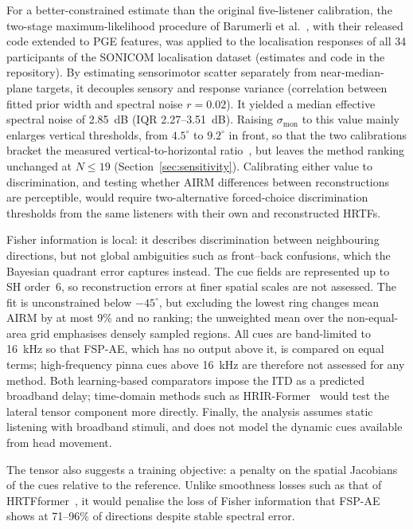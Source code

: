 \documentclass[journal]{IEEEtran}
\begin{document}
For a better-constrained estimate than the original five-listener calibration, the two-stage maximum-likelihood procedure of Barumerli et al.~\cite{Barumerli2026}, with their released code extended to PGE features, was applied to the localisation responses of all 34 participants of the SONICOM localisation dataset (estimates and code in the repository). By estimating sensorimotor scatter separately from near-median-plane targets, it decouples sensory and response variance (correlation between fitted prior width and spectral noise \(r=0.02\)). It yielded a median effective spectral noise of 2.85~dB (IQR 2.27--3.51~dB). Raising \(\sigma_{\mathrm{mon}}\) to this value mainly enlarges vertical thresholds, from \(4.5^\circ\) to \(9.2^\circ\) in front, so that the two calibrations bracket the measured vertical-to-horizontal ratio~\cite{Grantham2003}, but leaves the method ranking unchanged at \(N\le19\) (Section~\ref{sec:sensitivity}). Calibrating either value to discrimination, and testing whether AIRM differences between reconstructions are perceptible, would require two-alternative forced-choice discrimination thresholds from the same listeners with their own and reconstructed HRTFs.

Fisher information is local: it describes discrimination between neighbouring directions, but not global ambiguities such as front--back confusions, which the Bayesian quadrant error captures instead. The cue fields are represented up to SH order~6, so reconstruction errors at finer spatial scales are not assessed. The fit is unconstrained below \(-45^\circ\), but excluding the lowest ring changes mean AIRM by at most 9\% and no ranking; the unweighted mean over the non-equal-area grid emphasises densely sampled regions. All cues are band-limited to 16~kHz so that FSP-AE, which has no output above it, is compared on equal terms; high-frequency pinna cues above 16~kHz are therefore not assessed for any method. Both learning-based comparators impose the ITD as a predicted broadband delay; time-domain methods such as HRIR-Former~\cite{Xu2026HRIRFormer} would test the lateral tensor component more directly. Finally, the analysis assumes static listening with broadband stimuli, and does not model the dynamic cues available from head movement.

The tensor also suggests a training objective: a penalty on the spatial Jacobians of the cues relative to the reference. Unlike smoothness losses such as that of HRTFformer~\cite{Hu2026HRTFformer}, it would penalise the loss of Fisher information that FSP-AE shows at 71--96\% of directions despite stable spectral error.
\end{document}
